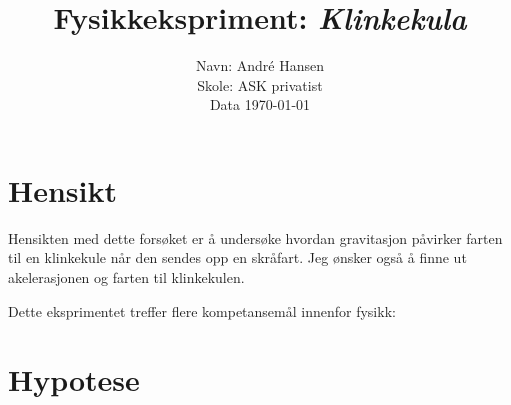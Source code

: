 \documentclass[a4paper,12pt]{article}
\title{Fysikkekspriment: \textit{Klinkekula}}
\author{Navn: André Hansen \\
Skole: ASK privatist \\
Data \today}
\date{}
\begin{document}
\maketitle

\section*{Hensikt}

Hensikten med dette forsøket er å undersøke hvordan gravitasjon påvirker farten til en klinkekule når den sendes opp en skråfart. Jeg ønsker også å finne ut akelerasjonen og farten til klinkekulen.

Dette eksprimentet treffer flere kompetansemål innenfor fysikk:

\section*{Hypotese}
\end{document}
